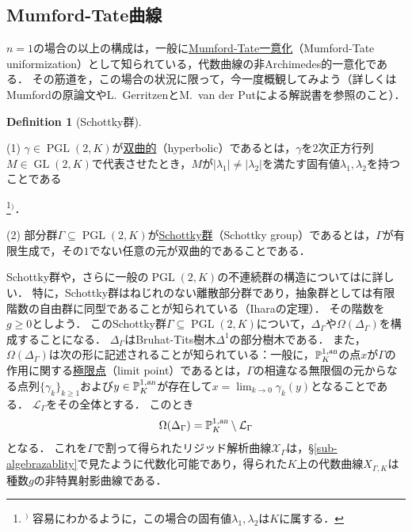 \documentclass[a4paper,12pt, dvipdfmx]{jsbook}
\def\P{\mathbb{P}}
\def\an{\textsl{an}}
\def\GL{\mathop{\mathrm{GL}}\nolimits}
\def\PGL{\mathop{\mathrm{PGL}}\nolimits}
\newcommand{\abs}[1]{\lvert#1\rvert}
\theoremstyle{plain}
\theoremstyle{definition}
\newtheorem{dfn}[thm]{\bfseries Definition}
\newcounter{chushaku}
\def\chu#1{\addtocounter{chushaku}{1}\footnote[\value{chushaku}]{${}^)$ #1}${}^)$}
\begin{document}
\subsection{Mumford-Tate曲線}\label{sub-MTcurves}
$n=1$の場合の以上の構成は，一般に\underline{Mumford-Tate一意化}（Mumford-Tate uniformization）として知られている，代数曲線の非Archimedes的一意化である．
その筋道を，この場合の状況に限って，今一度概観してみよう（詳しくはMumfordの原論文\cite{Mumf1}やL.\ GerritzenとM.\ van der Putによる解説書\cite{GVP}を参照のこと）．

\begin{dfn}[Schottky群]\label{dfn-MTgroup}{\rm 
(1) $\gamma\in\PGL(2,K)$が\underline{双曲的}（hyperbolic）であるとは，$\gamma$を$2$次正方行列$M\in\GL(2,K)$で代表させたとき，$M$が$\abs{\lambda_1}\neq\abs{\lambda_2}$を満たす固有値$\lambda_1,\lambda_2$を持つことである\chu{容易にわかるように，この場合の固有値$\lambda_1,\lambda_2$は$K$に属する．}．

(2) 部分群$\Gamma\subseteq\PGL(2,K)$が\underline{Schottky群}（Schottky group）であるとは，$\Gamma$が有限生成で，その$1$でない任意の元が双曲的であることである．}
\end{dfn}

Schottky群や，さらに一般の$\PGL(2,K)$の不連続群の構造については\cite[Chap.\ I, \S3]{GVP}に詳しい．
特に，Schottky群はねじれのない離散部分群であり，抽象群としては有限階数の自由群に同型であることが知られている（Iharaの定理）．
その階数を$g\geq 0$としよう．
このSchottky群$\Gamma\subseteq\PGL(2,K)$について，$\Delta_{\Gamma}$や$\Omega(\Delta_{\Gamma})$を構成することになる．
$\Delta_{\Gamma}$はBruhat-Tits樹木$\Delta^1$の部分樹木である．
また，$\Omega(\Delta_{\Gamma})$は次の形に記述されることが知られている：一般に，$\P^{1,\an}_K$の点$x$が$\Gamma$の作用に関する\underline{極限点}（limit point）であるとは，$\Gamma$の相違なる無限個の元からなる点列$\{\gamma_k\}_{k\geq 1}$および$y\in\P^{1,\an}_K$が存在して$x=\lim_{k\rightarrow 0}\gamma_k(y)$となることである．
$\mathcal{L}_{\Gamma}$をその全体とする．
このとき
$$
\Omega(\Delta_{\Gamma})=\P^{1,\an}_K\setminus\mathcal{L}_{\Gamma}
$$
となる．
これを$\Gamma$で割って得られたリジッド解析曲線$\mathcal{X}_{\Gamma}$は，\S\ref{sub-algebrazablity}で見たように代数化可能であり，得られた$K$上の代数曲線$X_{\Gamma,K}$は種数$g$の非特異射影曲線である．
\end{document}
